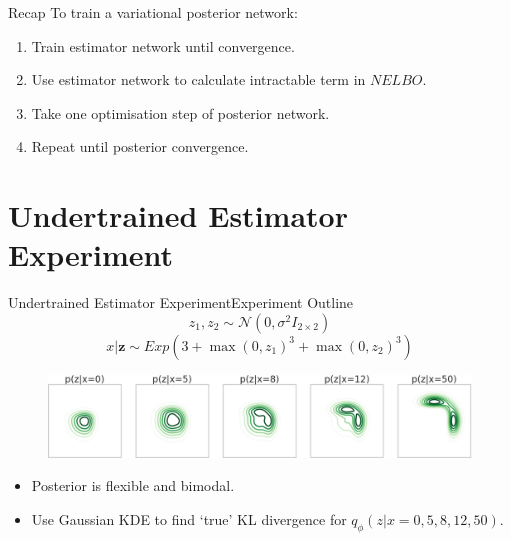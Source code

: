 \documentclass[handout]{beamer}
\begin{document}
\begin{frame}{Recap}
To train a variational posterior network:
\begin{enumerate}
\item Train estimator network until convergence.
\vspace{0.3cm}
\item Use estimator network to calculate intractable term in $NELBO$.
\vspace{0.3cm}
\item Take one optimisation step of posterior network.
\vspace{0.3cm}
\item Repeat until posterior convergence.
\end{enumerate}
\end{frame}
\section{Undertrained Estimator Experiment}
\begin{frame}{Undertrained Estimator Experiment}{Experiment Outline}
\[z_1,z_2\sim \mathcal{N} (0,\sigma^2 I_{2\times 2})\]
\[x|\bm{z}\sim Exp(3+\max(0,z_1)^3+\max(0,z_2)^3)\]
\begin{figure}[h]
\includegraphics[width=\textwidth]{sprinklertrue.png}
\end{figure}
\begin{itemize}
\item Posterior is flexible and bimodal.
\item Use Gaussian KDE to find `true' KL divergence for $q_\phi(z|x=0,5,8,12,50)$.
\end{itemize}
\end{frame}
\end{document}
